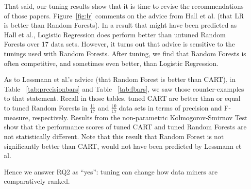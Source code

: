 \documentclass{sig-alternative}
\newcommand{\fig}[1]{Figure~\ref{fig:#1}}
\newcommand{\tab}[1]{Table ~\ref{tab:#1}}
\begin{document}
That said, our tuning results show that it is time to revise
the recommendations of those papers. 
  \fig{lr} comments on the advice from Hall et al. (that LR is better than Random Forests).
 In a result that might have been predicted as Hall et al., Logistic Regression does perform better than untuned Random
Forests over 17 data sets. 
However, it turns out that advice is sensitive to the tunings
used with Random Forests. After tuning, we find that Random Forests
is often competitive, and sometimes even better, than Logistic Regression. 


As to Lessmann et al.'s advice (that Random Forest is better than 
CART),  
in \tab{precisionbars} and \tab{fbars}, we saw those counter-examples
to that statement.
Recall in those tables,
tuned CART are better than or equal
to tuned Random Forests in $\frac{11}{17}$ and $\frac{10}{17}$ data sets in
terms of precision and F-measure, respectively. Results from the non-parametric
Kolmogorov-Smirnov Test show that the performance 
scores of tuned CART and tuned Random Forests are not statistically different.
Note that this  result that Random Forest is  not significantly better than   CART, would not have been
predicted by   Lessmann et al.
  

Hence we answer RQ2 as ``yes'': tuning can change how  data miners are comparatively ranked.
 


\end{document}
